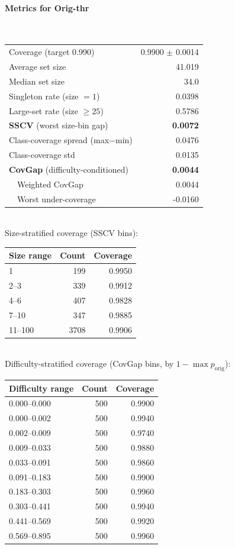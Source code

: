 \documentclass[parskip=half]{scrartcl}
\begin{document}
\paragraph{Metrics for Orig-thr}~\\
\begin{tabular}{l r}
\hline
Coverage (target 0.990) & 0.9900 $\pm$ 0.0014 \\
Average set size & 41.019 \\
Median set size & 34.0 \\
Singleton rate (size $=1$) & 0.0398 \\
Large-set rate (size $\geq 25$) & 0.5786 \\
\textbf{SSCV} (worst size-bin gap) & \textbf{0.0072} \\
Class-coverage spread (max$-$min) & 0.0476 \\
Class-coverage std & 0.0135 \\
\textbf{CovGap} (difficulty-conditioned) & \textbf{0.0044} \\
~~Weighted CovGap & 0.0044 \\
~~Worst under-coverage & -0.0160 \\
\hline
\end{tabular}\\[0.5em]
\textsf{\scriptsize Size-stratified coverage (SSCV bins):}\\
\begin{tabular}{l r r}
\hline
Size range & Count & Coverage \\
\hline
1 & 199 & 0.9950 \\
2--3 & 339 & 0.9912 \\
4--6 & 407 & 0.9828 \\
7--10 & 347 & 0.9885 \\
11--100 & 3708 & 0.9906 \\
\hline
\end{tabular}\\[0.5em]
\textsf{\scriptsize Difficulty-stratified coverage (CovGap bins, by $1-\max p_{\mathrm{orig}}$):}\\
\begin{tabular}{l r r}
\hline
Difficulty range & Count & Coverage \\
\hline
0.000--0.000 & 500 & 0.9900 \\
0.000--0.002 & 500 & 0.9940 \\
0.002--0.009 & 500 & 0.9740 \\
0.009--0.033 & 500 & 0.9880 \\
0.033--0.091 & 500 & 0.9860 \\
0.091--0.183 & 500 & 0.9900 \\
0.183--0.303 & 500 & 0.9960 \\
0.303--0.441 & 500 & 0.9940 \\
0.441--0.569 & 500 & 0.9920 \\
0.569--0.895 & 500 & 0.9960 \\
\hline
\end{tabular}\\[0.5em]
\end{document}
